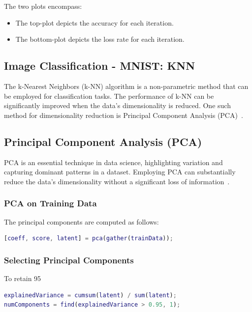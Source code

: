 The two plots encompass:
\begin{itemize}
    \item The top-plot depicts the accuracy for each iteration.
    \item The bottom-plot depicts the loss rate for each iteration.
\end{itemize}
\subsection{Image Classification - MNIST: KNN}


The k-Nearest Neighbors (k-NN) algorithm is a non-parametric method that can be employed for classification tasks. The performance of k-NN can be significantly improved when the data's dimensionality is reduced. One such method for dimensionality reduction is Principal Component Analysis (PCA)~\cite{james2013introduction}.



\subsection{Principal Component Analysis (PCA)}

PCA is an essential technique in data science, highlighting variation and capturing dominant patterns in a dataset. Employing PCA can substantially reduce the data's dimensionality without a significant loss of information~\cite{james2013introduction}.

\subsubsection{PCA on Training Data}

The principal components are computed as follows:
\begin{lstlisting}[language=Matlab]
[coeff, score, latent] = pca(gather(trainData));
\end{lstlisting}

\subsubsection{Selecting Principal Components}

To retain 95%
\begin{lstlisting}[language=Matlab]
explainedVariance = cumsum(latent) / sum(latent);
numComponents = find(explainedVariance > 0.95, 1);
\end{lstlisting}

